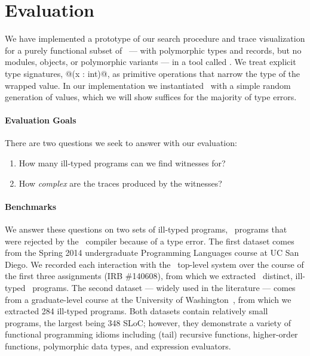 \section{Evaluation}
\label{sec:evaluation}

We have implemented a prototype of our search procedure and trace
visualization for a purely functional subset of \ocaml\
--- with polymorphic types and records, but no modules, objects, or polymorphic variants ---
in a tool called \nanomaly.
%
We treat explicit type signatures, \eg @(x : int)@, as
primitive operations that narrow the type of the wrapped value.
%
In our implementation we instantiated \gensym\ with a simple random
generation of values, which we will show suffices for the majority of
type errors.

\paragraph{Evaluation Goals}
%
There are two questions we seek to answer with our evaluation:
%
\begin{enumerate}
\item {}
      How many ill-typed programs can we find witnesses for?
\item {}
      How \emph{complex} are the traces produced by the witnesses?
\end{enumerate}

\paragraph{Benchmarks}
We answer these questions on two sets of ill-typed programs, \ie\
programs that were rejected by the \ocaml\ compiler because of a
type error.
%
The first dataset comes from the Spring 2014 undergraduate Programming
Languages course at UC San Diego.
%
We recorded each interaction with the \ocaml\ top-level system over the
course of the first three assignments (IRB  
\#140608),
from which we extracted \ucsdsize\ distinct, ill-typed \ocaml\ programs.
%
The second dataset --- widely used in the literature --- comes from a
graduate-level course at the University of Washington~\cite{Lerner2006-pj},
from which we extracted 284 ill-typed programs.
%
Both datasets contain relatively small programs, the largest being 348
SLoC; however, they demonstrate a variety of functional programming
idioms including (tail) recursive functions, higher-order functions,
polymorphic data types, and expression evaluators.


